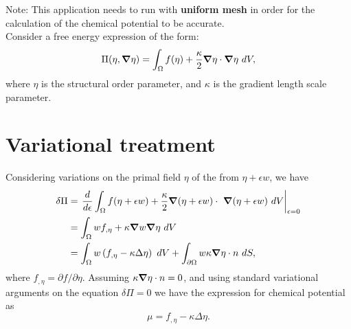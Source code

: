\documentclass[10pt]{article}
\newcommand{\gv}[1]{\ensuremath{\mbox{\boldmath$ #1 $}}}
\newcommand{\grad}[1]{\gv{\nabla} #1}
\begin{document}
Note: This application needs to run with {\bf uniform mesh} in order for the calculation of the chemical potential to be accurate.\\

Consider a free energy expression of the form:
\begin{equation}
  \Pi(\eta, \grad  \eta) = \int_{\Omega}    f( \eta ) + \frac{\kappa}{2} \grad  \eta  \cdot \grad  \eta    ~dV, 
\end{equation}
where $\eta$ is the structural order parameter, and $\kappa$ is the gradient length scale parameter.
	
\section{Variational treatment}
Considering variations on the primal field $\eta$ of the from $\eta+\epsilon w$, we have
\begin{align}
\delta \Pi &=  \left. \frac{d}{d\epsilon} \int_{\Omega}  f(\eta+\epsilon w) +  \frac{\kappa}{2} \grad  (\eta+\epsilon w)  \cdot  ~\grad  (\eta+\epsilon w)   ~dV \right\vert_{\epsilon=0} \\
&=  \int_{\Omega}   w f_{,\eta} +   \kappa \grad w \grad  \eta    ~dV \\
&=  \int_{\Omega}   w \left( f_{,\eta} -  \kappa \Delta \eta \right)  ~dV  +   \int_{\partial \Omega}   w \kappa \grad \eta \cdot n   ~dS,
\end{align}
where $f_{,\eta} = \partial f/\partial \eta$.
Assuming $\kappa \grad \eta \cdot n = 0$, and using standard variational arguments on the equation $\delta \Pi =0$ we have the expression for chemical potential as
\begin{equation}
  \mu  = f_{,\eta} -  \kappa \Delta \eta.
\end{equation}
\end{document}
